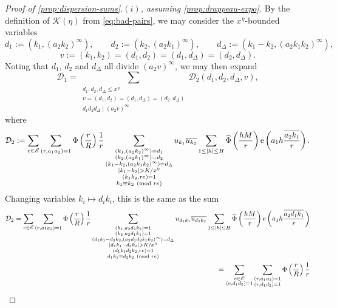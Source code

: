 \documentclass[reqno,11pt]{amsart}
\theoremstyle{definition}
\theoremstyle{remark}
\numberwithin{equation}{section}
\newcommand{\msE}{\mathscr{E}}
\newcommand{\mD}{\mathcal{D}}
\newcommand{\mK}{\mathcal{K}}
\newcommand{\e}{\textnormal{e}}
\renewcommand{\bar}{\overline}
\renewcommand{\hat}{\widehat}
\renewcommand{\pmod}[1]{\ (\textnormal{mod } #1)}
\begin{document}
\begin{proof}[Proof of \cref{prop:dispersion-sums}.$(i)$, assuming \cref{prop:drappeau-expo}]
By the definition of $\mK(\eta)$ from \cref{eq:bad-pairs}, we may consider the $x^{\eta}$-bounded variables 
\[
    d_1 := (k_1, (a_2 k_2)^\infty), \qquad d_2 := (k_2, (a_2 k_1)^\infty), \qquad d_\Delta := (k_1 - k_2, (a_2 k_1 k_2)^\infty),
\]
\begin{equation} \label{eq:v}
    v := (k_1, k_2) = (d_1, d_2) = (d_1, d_\Delta) = (d_2, d_\Delta).
\end{equation}
Noting that $d_1$, $d_2$ and $d_\Delta$ all divide $(a_2 v)^\infty$, we may then expand
\begin{equation} \label{eq:D12}
    \mD_1 = \sum_{\substack{d_1, d_2, d_\Delta \le x^{\eta} \\ v = (d_1, d_2) = (d_1, d_\Delta) = (d_2, d_\Delta) \\ d_1 d_2 d_\Delta \mid (a_2v)^\infty}} \mD_2(d_1, d_2, d_\Delta, v),
\end{equation}
where
\[
    \mD_2 := \sum_{e \in \msE} \sum_{(r, a_1 a_2) = 1} \Phi\left(\frac{r}{R}\right) \frac{1}{r}
    \sum_{\substack{(k_1, (a_2 k_2)^\infty) = d_1 \\ (k_2, (a_2 k_1)^\infty) = d_2 \\ (k_1 - k_2, (a_2 k_1 k_2)^\infty) = d_\Delta \\ |k_1 - k_2| > K/x^\eta \\ (k_1 k_2, re) = 1 \\ k_1 \equiv k_2 \pmod{re}}}
    u_{k_1} \bar{u_{k_2}}
    \sum_{1 \le |h| \le H} \hat{\Phi}\left(\frac{hM}{r}\right) \e\left(a_1 h \frac{\bar{a_2 k_1}}{r} \right).
\]
Changing variables $k_i \mapsto d_i k_i$, this is the same as the sum
\[
\begin{aligned}
    \mD_2 = 
    \sum_{e \in \msE} \sum_{(r, a_1 a_2) = 1} \Phi\left(\frac{r}{R}\right) \frac{1}{r}
    \sum_{\substack{(k_1, a_2 d_2 k_2) = 1 \\ (k_2, a_2 d_1 k_1) = 1 \\ (d_1 k_1 - d_2 k_2, (a_2 d_1 d_2 k_1 k_2)^\infty) = d_\Delta \\ |d_1 k_1 - d_2 k_2| > K/x^{\eta} \\ (d_1 k_1 d_2 k_2, re) = 1 \\ d_1 k_1 \equiv d_2 k_2 \pmod{re}}} u_{d_1k_1} \bar{u_{d_2k_2}} 
    \sum_{1 \le |h| \le H} \hat{\Phi}\left(\frac{hM}{r}\right) \e\left(a_1 h \frac{\bar{a_2d_1k_1}}{r} \right)
    \\
    =
    \sum_{\substack{e \in \msE \\ (e, d_1 d_2) = 1}} \sum_{\substack{(r, a_1 a_2) = 1 \\ (r, d_1 d_2) = 1}} \Phi\left(\frac{r}{R}\right) \frac{1}{r}

\end{aligned}\]
\end{proof}
\end{document}
